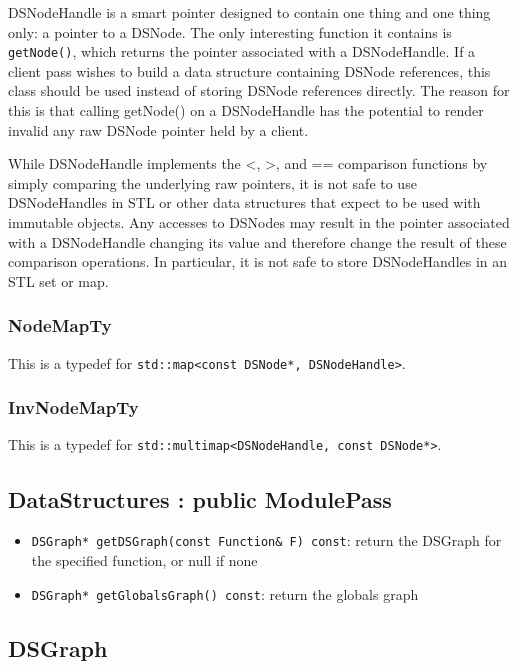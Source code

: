 \documentclass{article}
\begin{document}
DSNodeHandle is a smart pointer designed to contain one thing and one
thing only: a pointer to a DSNode.  The only interesting function it
contains is \texttt{getNode()}, which returns the pointer associated
with a DSNodeHandle.  If a client pass wishes to build a data
structure containing DSNode references, this class should be used
instead of storing DSNode references directly.  The reason for this is
that calling getNode() on a DSNodeHandle has the potential to render
invalid any raw DSNode pointer held by a client.

While DSNodeHandle implements the <, >, and == comparison functions by
simply comparing the underlying raw pointers, it is not safe to use
DSNodeHandles in STL or other data structures that expect to be used
with immutable objects.  Any accesses to DSNodes may result in the
pointer associated with a DSNodeHandle changing its value and
therefore change the result of these comparison operations.  In
particular, it is not safe to store DSNodeHandles in an STL set or
map.

\subsubsection{NodeMapTy}

This is a typedef for \texttt{std::map<const DSNode*, DSNodeHandle>}.

\subsubsection{InvNodeMapTy}

This is a typedef for \texttt{std::multimap<DSNodeHandle, const DSNode*>}.

\subsection{DataStructures : public ModulePass}

\begin{itemize}
\item \texttt{DSGraph* getDSGraph(const Function\& F) const}: return
  the DSGraph for the specified function, or null if none
\item \texttt{DSGraph* getGlobalsGraph() const}: return the globals
  graph
\end{itemize}

\subsection{DSGraph}
\end{document}
